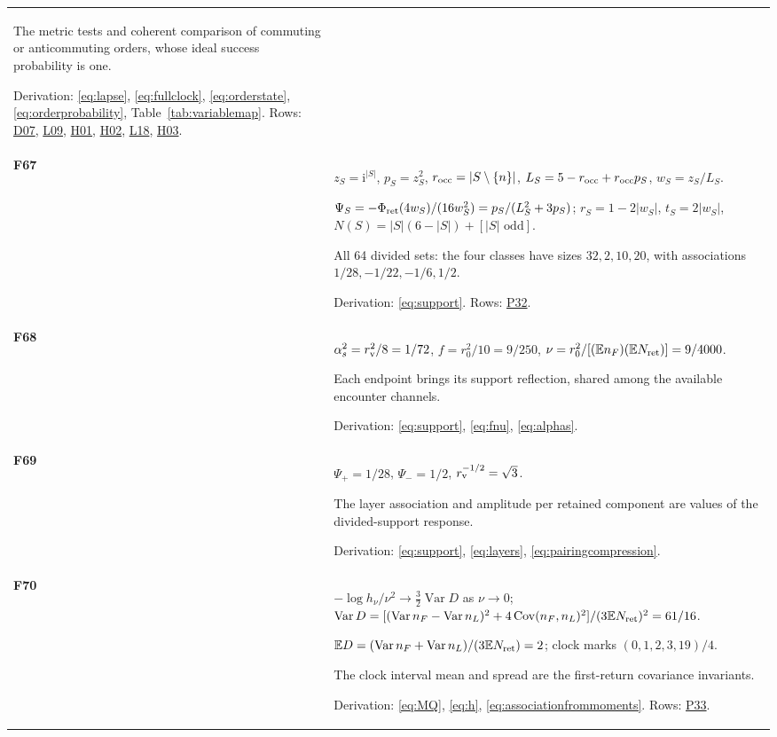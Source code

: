 \documentclass[aps,prx,onecolumn,10pt,notitlepage,nofootinbib,longbibliography]{revtex4-2}
\numberwithin{equation}{section}
\numberwithin{table}{section}
\newcommand{\EE}{\mathbb E}
\newcommand{\Var}{\operatorname{Var}}
\newcommand{\Cov}{\operatorname{Cov}}
\newcommand{\ii}{\mathrm i}
\newcommand{\Phis}{\Phi_{\rm ret}}
\begin{document}
\begin{longtable}{@{}>{\raggedright\arraybackslash}p{}>{\raggedright\arraybackslash}p{}@{}}
The metric tests and coherent comparison of commuting or anticommuting orders, whose ideal success probability is one.\par
Derivation: \eqref{eq:lapse}, \eqref{eq:fullclock}, \eqref{eq:orderstate}, \eqref{eq:orderprobability}, Table~\ref{tab:variablemap}. Rows: \hyperlink{row-D07}{D07}, \hyperlink{row-L09}{L09}, \hyperlink{row-H01}{H01}, \hyperlink{row-H02}{H02}, \hyperlink{row-L18}{L18}, \hyperlink{row-H03}{H03}.\\[7pt]
\hypertarget{formula-F67}{}\textbf{F67}\label{formula:F67} & $z_S=\ii^{|S|}$, $p_S=z_S^2$, $r_{\rm occ}=|S\setminus\{n\}|$, $L_S=5-r_{\rm occ}+r_{\rm occ}p_S$, $w_S=z_S/L_S$.\par $\Psi_S=-\Phis(4w_S)/(16w_S^2)=p_S/(L_S^2+3p_S)$; $r_S=1-2|w_S|$, $t_S=2|w_S|$, $N(S)=|S|(6-|S|)+[|S|\text{ odd}]$.\par
All 64 divided sets: the four classes have sizes $32,2,10,20$, with associations $1/28,-1/22,-1/6,1/2$.\par
Derivation: \eqref{eq:support}. Rows: \hyperlink{row-P32}{P32}.\\[7pt]
\hypertarget{formula-F68}{}\textbf{F68}\label{formula:F68} & $\alpha_s^2=r_{\rm v}^2/8=1/72$, $f=r_0^2/10=9/250$, $\nu=r_0^2/[(\EE n_F)(\EE N_{\rm ret})]=9/4000$.\par
Each endpoint brings its support reflection, shared among the available encounter channels.\par
Derivation: \eqref{eq:support}, \eqref{eq:fnu}, \eqref{eq:alphas}. \\[7pt]
\hypertarget{formula-F69}{}\textbf{F69}\label{formula:F69} & $\Psi_+=1/28$, $\Psi_-=1/2$, $r_{\rm v}^{-1/2}=\sqrt3$.\par
The layer association and amplitude per retained component are values of the divided-support response.\par
Derivation: \eqref{eq:support}, \eqref{eq:layers}, \eqref{eq:pairingcompression}. \\[7pt]
\hypertarget{formula-F70}{}\textbf{F70}\label{formula:F70} & $-\log h_\nu/\nu^2\to\frac32\Var D$ as $\nu\to0$; $\Var D=[(\Var n_F-\Var n_L)^2+4\Cov(n_F,n_L)^2]/(3\EE N_{\rm ret})^2=61/16$.\par $\EE D=(\Var n_F+\Var n_L)/(3\EE N_{\rm ret})=2$; clock marks $(0,1,2,3,19)/4$.\par
The clock interval mean and spread are the first-return covariance invariants.\par
Derivation: \eqref{eq:MQ}, \eqref{eq:h}, \eqref{eq:associationfrommoments}. Rows: \hyperlink{row-P33}{P33}.\\[7pt]

\end{longtable}
\end{document}
